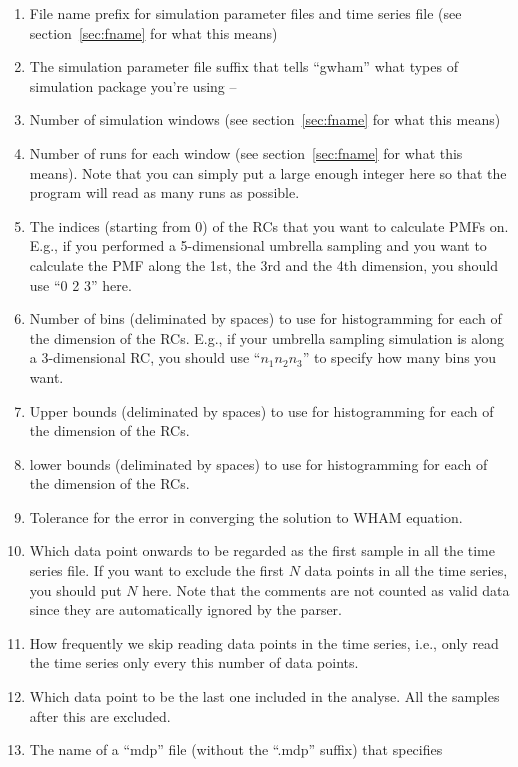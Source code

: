 \begin{enumerate}
  \item File name prefix for simulation parameter files and time series file
  (see section~\ref{sec:fname} for what this means)
  \item The simulation parameter file suffix that tells ``gwham'' what types of
  simulation package you're using -- 
  \item Number of simulation windows (see section~\ref{sec:fname} for what this
  means)
  \item Number of runs for each window (see section~\ref{sec:fname} for what
  this means). Note that you can simply put a large enough integer here so that
  the program will read as many runs as possible.
  \item The indices (starting from $0$) of the RCs that you want to calculate
  PMFs on. E.g., if you performed a 5-dimensional umbrella sampling and you
  want to calculate the PMF along the 1st, the 3rd and the 4th dimension, you
  should use ``0 2 3'' here.
  \item Number of bins (deliminated by spaces) to use for histogramming for
  each of the dimension of the RCs. E.g., if your umbrella sampling simulation
  is along a 3-dimensional RC, you should use ``$n_{1} n_{2} n_{3}$'' to
  specify how many bins you want.
  \item Upper bounds (deliminated by spaces) to use for histogramming for
  each of the dimension of the RCs.
  \item lower bounds (deliminated by spaces) to use for histogramming for
  each of the dimension of the RCs.
  \item Tolerance for the error in converging the solution to WHAM equation.
  \item Which data point onwards to be regarded as the first sample in all the
  time series file.  If you want to exclude the first $N$ data points in all
  the time series, you should put $N$ here. Note that the comments are not
  counted as valid data since they are automatically ignored by the parser.
  \item How frequently we skip reading data points in the time series, i.e.,
  only read the time series only every this number of data points.
  \item Which data point to be the last one included in the analyse. All the 
  samples after this are excluded.
  \item The name of a ``mdp'' file (without the ``.mdp'' suffix) that specifies 

\end{enumerate}
